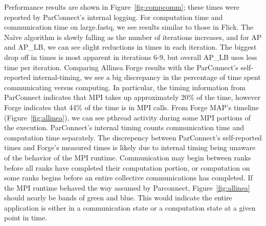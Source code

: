 \documentclass[11pt]{elsarticle}
\begin{document}
Performance results are shown in Figure~\ref{fig:compcomm}; these times were reported by ParConnect's internal logging.
For computation time and communication time on large.fastq, we see results similar to those in Flick\cite{Flick:2015}. The Na{\"i}ve algorithm is slowly falling as the number of iterations increases, and for AP and AP\_LB, we can see slight reductions in times in each iteration. The biggest drop off in times is most apparent in iterations 6-9, but overall AP\_LB uses less time per iteration. Comparing Allinea Forge results with the ParConnect's self-reported internal-timing, we see a big discrepancy in the percentage of time spent communicating versus computing. In particular, the timing information from ParConnect indicates that MPI takes up approximately 20\% of the time, however Forge indicates that 44\% of the time is in MPI calls. From Forge MAP's timeline (Figure~\ref{fig:allinea}), we can see pthread activity during some MPI portions of the execution. ParConnect's internal timing counts communication time and computation time separately. The discrepency between ParConnect's self-reported times and Forge's measured times is likely due to internal timing being unaware of the behavior of the MPI runtime. Communication may begin between ranks before all ranks have completed their computation portion, or computation on some ranks begins before an entire collective communications has completed. If the MPI runtime behaved the way assumed by Parconnect, Figure~\ref{fig:allinea} should nearly be bands of green and blue. This would indicate the entire application is either in a communication state or a computation state at a given point in time.
\end{document}
